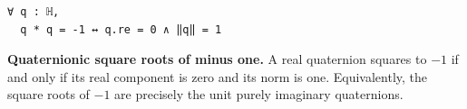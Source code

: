 \begin{list}{}{%
  \setlength{\leftmargin}{0pt}%
  \setlength{\rightmargin}{0pt}%
  \setlength{\labelwidth}{0pt}%
  \setlength{\labelsep}{0pt}%
  \setlength{\itemindent}{0pt}%
  \setlength{\itemsep}{1.25em}%
  \setlength{\parsep}{0pt}%
  \setlength{\topsep}{0.75em}%
}

\item
\begin{samepage}
\begin{lstlisting}[basicstyle=\ttfamily\footnotesize,frame=single,breaklines=true]
∀ q : ℍ,
  q * q = -1 ↔ q.re = 0 ∧ ‖q‖ = 1
\end{lstlisting}
\noindent\textbf{Quaternionic square roots of minus one.}
A real quaternion squares to $-1$ if and only if its real component is zero
and its norm is one. Equivalently, the square roots of $-1$ are precisely the
unit purely imaginary quaternions.
\end{samepage}

\end{list}
